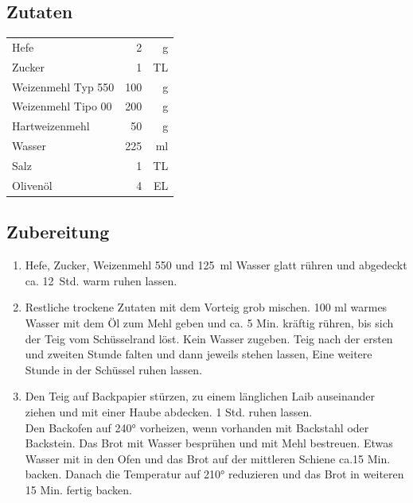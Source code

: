 \subsection*{Zutaten}
\begin{tabular}{lrr}
    Hefe               &   2 &  g \\
    Zucker             &   1 & TL \\
    Weizenmehl Typ 550 & 100 &  g \\
    Weizenmehl Tipo 00 & 200 &  g \\
    Hartweizenmehl     &  50 &  g \\
    Wasser             & 225 & ml \\
    Salz               &   1 & TL \\
    Olivenöl           &   4 & EL
\end{tabular} 


\subsection*{Zubereitung}

\begin{enumerate}
    \item Hefe, Zucker, Weizenmehl 550 und 125 ml Wasser glatt rühren und abgedeckt ca. 12 Std. warm ruhen lassen. 
    \item Restliche trockene Zutaten mit dem Vorteig grob mischen. 100 ml
    warmes Wasser mit dem Öl zum Mehl geben und ca. 5 Min. kräftig
    rühren, bis sich der Teig vom Schüsselrand löst. Kein Wasser zugeben. Teig nach der ersten und zweiten Stunde falten  und dann jeweils stehen lassen, Eine weitere Stunde in der Schüssel ruhen lassen.
    
    \item Den Teig auf Backpapier stürzen, zu einem länglichen Laib auseinander ziehen und mit einer Haube abdecken. 1 Std. ruhen lassen.\\
    Den Backofen auf 240° vorheizen, wenn vorhanden mit Backstahl oder Backstein. Das Brot
    mit Wasser besprühen und mit Mehl bestreuen. Etwas Wasser mit in den Ofen und das Brot auf der mittleren Schiene ca.15 Min. backen. Danach die Temperatur auf 210° reduzieren und das Brot in weiteren 15 Min. fertig backen.
    
\end{enumerate}   















 
 
 

 









